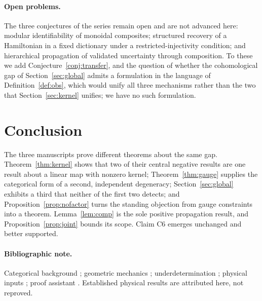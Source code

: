 \documentclass[11pt]{article}
\theoremstyle{definition}
\begin{document}
\paragraph{Open problems.}
The three conjectures of the series remain open and are not advanced here:
modular identifiability of monoidal composites; structured recovery of a
Hamiltonian in a fixed dictionary under a restricted-injectivity condition; and
hierarchical propagation of validated uncertainty through composition. To these
we add Conjecture~\ref{conj:transfer}, and the question of whether the
cohomological gap of Section~\ref{sec:global} admits a formulation in the
language of Definition~\ref{def:obs}, which would unify all three mechanisms
rather than the two that Section~\ref{sec:kernel} unifies; we have no such
formulation.

\section{Conclusion}

The three manuscripts prove different theorems about the same gap.
Theorem~\ref{thm:kernel} shows that two of their central negative results are
one result about a linear map with nonzero kernel; Theorem~\ref{thm:gauge}
supplies the categorical form of a second, independent degeneracy;
Section~\ref{sec:global} exhibits a third that neither of the first two detects;
and Proposition~\ref{prop:nofactor} turns the standing objection from gauge
constraints into a theorem. Lemma~\ref{lem:comp} is the sole positive
propagation result, and Proposition~\ref{prop:joint} bounds its scope. Claim C6
emerges unchanged and better supported.

\paragraph{Bibliographic note.}
Categorical background \cite{MacLane,BaezStay,CDP}; geometric mechanics
\cite{AM,Arnold,BottTu,HLW}; underdetermination \cite{Duhem,Glymour,LC,Pearl};
physical inputs \cite{AB,Chambers,Tonomura,WuYang,CHR,Groenewold,vanHove,Gotay};
proof assistant \cite{Lean4}. Established physical results are attributed here,
not reproved.
\end{document}
